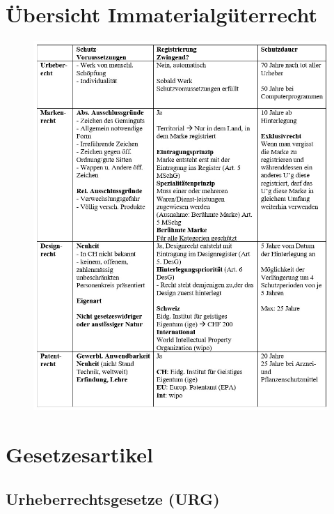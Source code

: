 \section{Übersicht Immaterialgüterrecht}
\begin{figure}[H]
	\centering
	\includegraphics[width=\textwidth]{figures/overviewImaterialgueter.jpeg}
\end{figure}

\section{Gesetzesartikel}

\subsection{Urheberrechtsgesetze (URG)}


